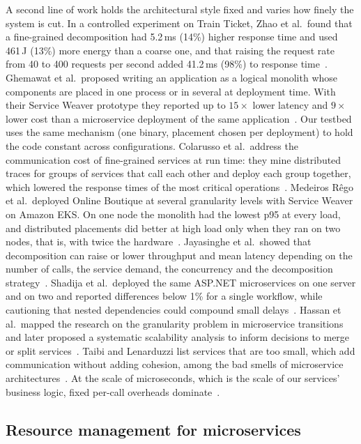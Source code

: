 A second line of work holds the architectural style fixed and varies how finely the system is cut.
In a controlled experiment on Train Ticket, Zhao et al.\ found that a fine-grained decomposition
had 5.2\,ms (14\%) higher response time and used 461\,J (13\%) more energy than a coarse one, and
that raising the request rate from 40 to 400 requests per second added 41.2\,ms (98\%) to response
time~\cite{Zhao2025}. Ghemawat et al.\ proposed writing an application as a logical monolith whose components are placed in one
process or in several at deployment time. With their Service Weaver prototype they reported up to $15\times$ lower
latency and $9\times$ lower cost than a microservice deployment of the same application~\cite{Ghemawat2023}. Our testbed uses the same mechanism (one binary, placement chosen per deployment)
to hold the code constant across configurations. Colarusso et al.\ address the communication cost of fine-grained services at run
time: they mine distributed traces for groups of services that call each other and deploy each group together, which
lowered the response times of the most critical operations~\cite{Colarusso2024}. Medeiros R\^ego et al.\ deployed Online Boutique at several
granularity levels with Service Weaver on Amazon EKS. On one node the monolith had the lowest p95 at every load,
and distributed placements did better at high load only when they ran on two nodes, that is, with twice the
hardware~\cite{MedeirosRego2025}. Jayasinghe et al.\ showed
that decomposition can raise or lower throughput and mean latency depending on the number of calls,
the service demand, the concurrency and the decomposition strategy~\cite{Jayasinghe2020}. Shadija
et al.\ deployed the same ASP.NET microservices on one server and on two and reported differences below 1\% for a
single workflow, while cautioning that nested dependencies could compound small delays~\cite{Shadija2017UCC}. Hassan et al.\ mapped the research on the granularity problem
in microservice transitions~\cite{Hassan2020} and later proposed a systematic scalability analysis to inform
decisions to merge or split services~\cite{Hassan2022}. Taibi and Lenarduzzi list services that are too small, which
add communication without adding cohesion, among the bad smells of microservice architectures~\cite{Taibi2018}.
At the scale of microseconds, which is the scale of our services' business logic, fixed per-call overheads
dominate~\cite{Barroso2017,Sriraman2018}.

\subsection{Resource management for microservices}
\label{sec:rw-resources}

